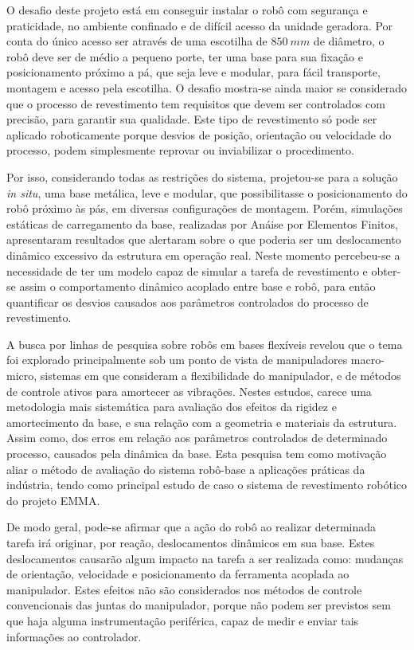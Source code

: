 O desafio deste projeto está em conseguir instalar o robô com segurança e
praticidade, no ambiente confinado e de difícil acesso da unidade geradora. Por
conta do único acesso ser através de uma escotilha de $850~mm$ de diâmetro, o
robô deve ser de médio a pequeno porte, ter uma base para sua fixação e
posicionamento próximo a pá, que seja leve e modular, para fácil transporte,
montagem e acesso pela escotilha. O desafio mostra-se ainda maior se considerado
que o processo de revestimento tem requisitos que devem ser controlados com
precisão, para garantir sua qualidade. Este tipo de revestimento só pode ser
aplicado roboticamente porque desvios de posição, orientação ou velocidade do
processo, podem simplesmente reprovar ou inviabilizar o procedimento.

Por isso, considerando todas as restrições do sistema, projetou-se para a
solução \textit{in situ}, uma base metálica, leve e modular, que possibilitasse
o posicionamento do robô próximo às pás, em diversas configurações de montagem.
Porém, simulações estáticas de carregamento da base, realizadas por Anáise por
Elementos Finitos, apresentaram resultados que alertaram sobre o que poderia ser
um deslocamento dinâmico excessivo da estrutura em operação real.
Neste momento percebeu-se a necessidade de ter um modelo capaz de simular a
tarefa de revestimento e obter-se assim o comportamento dinâmico acoplado entre
base e robô, para então quantificar os desvios causados aos parâmetros
controlados do processo de revestimento.

A busca por linhas de pesquisa sobre robôs em bases flexíveis revelou que o tema
foi explorado principalmente sob um ponto de vista de manipuladores macro-micro,
sistemas em que consideram a flexibilidade do manipulador, e de métodos de
controle ativos para amortecer as vibrações. Nestes estudos, carece uma
metodologia mais sistemática para avaliação dos efeitos da rigidez e
amortecimento da base, e sua relação com a geometria e materiais da estrutura.
Assim como, dos erros em relação aos parâmetros controlados de determinado
processo, causados pela dinâmica da base. Esta pesquisa tem como motivação aliar
o método de avaliação do sistema robô-base a aplicações práticas da indústria,
tendo como principal estudo de caso o sistema de revestimento robótico do
projeto EMMA.

De modo geral, pode-se afirmar que a ação do robô ao realizar
determinada tarefa irá originar, por reação, deslocamentos dinâmicos em sua
base. Estes deslocamentos causarão algum impacto na tarefa a ser realizada como:
mudanças de orientação, velocidade e posicionamento da ferramenta acoplada ao
manipulador. Estes efeitos não são considerados nos métodos de controle
convencionais das juntas do manipulador, porque não podem ser previstos sem que
haja alguma instrumentação periférica, capaz de medir e enviar tais informações
ao controlador.

